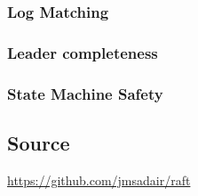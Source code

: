 \documentclass[a4paper,11pt]{article}
\begin{document}
\subsubsection*{Log Matching}

\subsubsection*{Leader completeness}

\subsubsection*{State Machine Safety}

\subsection*{Source}
\href{https://github.com/jmsadair/raft}{https://github.com/jmsadair/raft}
\end{document}
